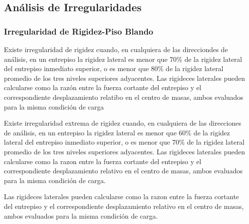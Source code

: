 \documentclass{article}%
\begin{document}
%
\subsection{Análisis de Irregularidades}%
\label{subsec:AnlisisdeIrregularidades}%

%
\subsubsection{Irregularidad de Rigidez-Piso Blando}%
\label{ssubsec:IrregularidaddeRigidez{-}PisoBlando}%
\begin{tcolorbox}[colback=gray!5!white,colframe=cyan!75!black,fonttitle=\bfseries,title=Tabla N°9 E-030]%
Existe irregularidad de rigidez cuando, en cualquiera de las direcciondes de análisis, en un entrepiso la rigidez lateral es menor que 70\% de la rigidez lateral del entrepiso inmediato superior, o es menor que 80\% de la rigidez lateral promedio de los tres niveles superiores adyacentes. 
 Las rigideces laterales pueden calcularse como la razón entre la fuerza cortante del entrepiso y el correspondiente desplazamiento relatibo en el centro de masas, ambos evaluados para la misma condición de carga %
\end{tcolorbox}%
\begin{tcolorbox}[colback=gray!5!white,colframe=cyan!75!black,fonttitle=\bfseries,title=Tabla N°9 E-030]%

Existe irregularidad extrema de rigidez cuando, en cualquiera de las direcciones de análisis, en un entrepiso la rigidez lateral es menor que 60\% de la rigidez lateral del entrepiso inmediato superior, o es menor que 70\% de la rigidez lateral promedio de los tres niveles superiores adyacentes.
Las rigideces laterales pueden calcularse como la razon entre la fuerza cortante del entrepiso y el correspondiente desplazamiento relativo en el centro de masas, ambos evaluados para la misma condición de carga.%
\end{tcolorbox}%
Las rigideces laterales pueden calcularse como la razon entre la fuerza cortante del entrepiso y el correspondiente desplazamiento relativo en el centro de masas, ambos evaluados para la misma condición de carga. \newline%
%
\end{document}
